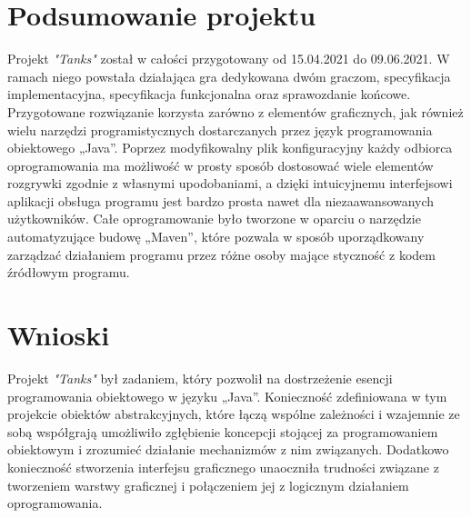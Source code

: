 \documentclass[11pt,a4paper]{report}
\begin{document}
\newpage

\section{Podsumowanie projektu}\label{sec:teskt}
Projekt  \textsl{"Tanks"} został w całości przygotowany od 15.04.2021 do 09.06.2021. W ramach niego powstała działająca gra dedykowana dwóm graczom, specyfikacja implementacyjna, specyfikacja funkcjonalna oraz sprawozdanie końcowe. Przygotowane rozwiązanie korzysta zarówno z elementów graficznych, jak również wielu narzędzi programistycznych dostarczanych przez język programowania obiektowego „Java”. Poprzez modyfikowalny plik konfiguracyjny każdy odbiorca oprogramowania ma możliwość w prosty sposób dostosować wiele elementów rozgrywki zgodnie z własnymi upodobaniami, a dzięki intuicyjnemu interfejsowi aplikacji obsługa programu jest bardzo prosta nawet dla niezaawansowanych użytkowników. Całe oprogramowanie było tworzone w oparciu o narzędzie automatyzujące budowę „Maven”, które pozwala w sposób uporządkowany zarządzać działaniem programu przez różne osoby mające styczność z kodem źródłowym programu.


\section{Wnioski}\label{sec:teskt}
 Projekt  \textsl{"Tanks"} był zadaniem, który pozwolił na dostrzeżenie esencji programowania obiektowego w języku „Java”. Konieczność zdefiniowana w tym projekcie obiektów abstrakcyjnych, które łączą wspólne zależności i wzajemnie ze sobą współgrają umożliwiło zgłębienie koncepcji stojącej za programowaniem obiektowym i zrozumieć działanie mechanizmów z nim związanych. Dodatkowo konieczność stworzenia interfejsu graficznego unaoczniła trudności związane z tworzeniem warstwy graficznej i połączeniem jej z logicznym działaniem oprogramowania.
\end{document}
